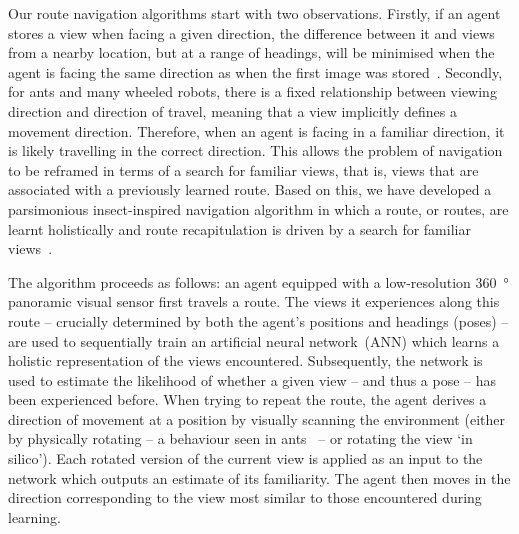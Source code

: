\documentclass[letterpaper]{article}
\begin{document}
Our route navigation algorithms start with two observations. 
Firstly, if an agent stores a view when facing a given direction, the difference between it and views from a nearby location, but at a range of headings, will be minimised when the agent is facing the same direction as when the first image was stored~\citep{Zeil2003}. 
Secondly, for ants and many wheeled robots, there is a fixed relationship between viewing direction and direction of travel, meaning that a view implicitly defines a movement direction.
Therefore, when an agent is facing in a familiar direction, it is likely travelling in the correct direction. 
This allows the problem of navigation to be reframed in terms of a search for familiar views, that is, views that are associated with a previously learned route.
Based on this, we have developed a parsimonious insect-inspired navigation algorithm in which a route, or routes, are learnt holistically and route recapitulation is driven by a search for familiar views~\citep{Baddeley2012}.

The algorithm proceeds as follows: an agent equipped with a low-resolution \SI{360}{\degree} panoramic visual sensor first travels a route.
The views it experiences along this route -- crucially determined by both the agent’s positions and headings (poses) -- are used to sequentially train an artificial neural network~(ANN) which learns a holistic representation of the views encountered. Subsequently, the network is used to estimate the likelihood of whether a given view -- and thus a pose -- has been experienced before.
When trying to repeat the route, the agent derives a direction of movement at a position by visually scanning the environment (either by physically rotating -- a behaviour seen in ants~\citep{Wystrach2014} -- or rotating the view `in silico').
Each rotated version of the current view is applied as an input to the network which outputs an estimate of its familiarity.
The agent then moves in the direction corresponding to the view most similar to those encountered during learning.
\end{document}
